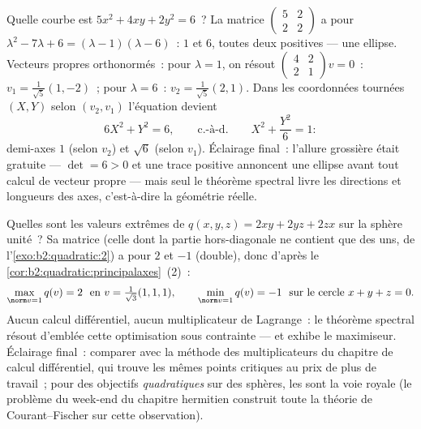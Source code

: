 \begin{example}\label{ex:b2:quadratic:ellipserun}
Quelle courbe est $5x^2 + 4xy + 2y^2 = 6$~? La matrice
$\begin{pmatrix} 5 & 2\\ 2 & 2\end{pmatrix}$ a pour  $\lambda^2 - 7\lambda + 6 = (\lambda - 1)(\lambda -
6)$~:  $1$ et $6$, toutes deux positives --- une
ellipse. Vecteurs propres orthonormés~: pour $\lambda = 1$, on
résout $\begin{pmatrix} 4 & 2\\ 2 & 1\end{pmatrix}v = 0$~: $v_1 =
\frac{1}{\sqrt5}(1, -2)$~; pour $\lambda = 6$~: $v_2 =
\frac{1}{\sqrt5}(2, 1)$. Dans les coordonnées tournées $(X, Y)$
selon $(v_2, v_1)$ l'équation devient
\[
6X^2 + Y^2 = 6,
\qquad\text{c.-à-d.}\qquad
X^2 + \frac{Y^2}{6} = 1 :
\]
demi-axes $1$ (selon $v_2$) et $\sqrt6$ (selon $v_1$).
Éclairage final~: l'allure grossière était gratuite --- $\det
= 6 > 0$ et une trace positive annoncent une ellipse avant tout
calcul de vecteur propre --- mais seul le théorème spectral livre
les directions et longueurs des axes, c'est-à-dire la géométrie
réelle.
\end{example}

\begin{example}\label{ex:b2:quadratic:sphereextremes}
Quelles sont les valeurs extrêmes de $q(x,y,z) = 2xy + 2yz + 2zx$
sur la sphère unité~? Sa matrice (celle dont la partie
hors-diagonale ne contient que des uns, de l'\cref{exo:b2:quadratic:2})
a pour  $2$ et $-1$ (double), donc d'après le~
\cref{cor:b2:quadratic:principalaxes}~(2)~:
\[
\max_{\norm v = 1} q(v) = 2
\ \text{ en } v = \tfrac{1}{\sqrt3}(1,1,1),
\qquad
\min_{\norm v = 1} q(v) = -1
\ \text{ sur le cercle } x + y + z = 0 .
\]
Aucun calcul différentiel, aucun multiplicateur de Lagrange~: le
théorème spectral résout d'emblée cette optimisation sous contrainte
--- et exhibe le maximiseur. Éclairage final~: comparer avec la
méthode des multiplicateurs du chapitre de calcul différentiel, qui
trouve les mêmes points critiques au prix de plus de travail~; pour
des objectifs \emph{quadratiques} sur des sphères, les  sont
la voie royale (le problème du week-end du chapitre hermitien
construit toute la théorie de Courant--Fischer sur cette
observation).
\end{example}

